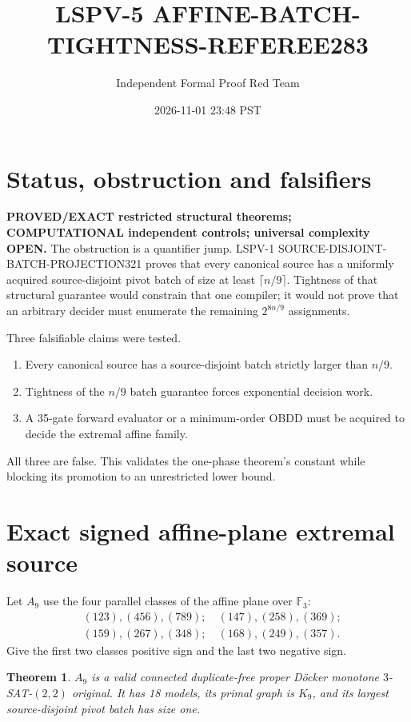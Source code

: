 \documentclass[11pt]{article}
\title{LSPV-5 AFFINE-BATCH-TIGHTNESS-REFEREE283}
\author{Independent Formal Proof Red Team}
\date{2026-11-01 23:48 PST}
\newtheorem{theorem}{Theorem}
\begin{document}
\maketitle

\section{Status, obstruction and falsifiers}

\textbf{PROVED/EXACT restricted structural theorems; COMPUTATIONAL independent
controls; universal complexity OPEN.}  The obstruction is a quantifier jump.
LSPV-1 SOURCE-DISJOINT-BATCH-PROJECTION321 proves that every canonical source
has a uniformly acquired source-disjoint pivot batch of size at least
$\lceil n/9\rceil$.  Tightness of that structural guarantee would constrain
that one compiler; it would not prove that an arbitrary decider must enumerate
the remaining $2^{8n/9}$ assignments.

Three falsifiable claims were tested.
\begin{enumerate}
\item Every canonical source has a source-disjoint batch strictly larger than
$n/9$.
\item Tightness of the $n/9$ batch guarantee forces exponential decision work.
\item A 35-gate forward evaluator or a minimum-order OBDD must be acquired to
decide the extremal affine family.
\end{enumerate}
All three are false.  This validates the one-phase theorem's constant while
blocking its promotion to an unrestricted lower bound.

\section{Exact signed affine-plane extremal source}

Let $A_9$ use the four parallel classes of the affine plane over
$\mathbb F_3$:
\begin{align*}
&(123),(456),(789);\quad (147),(258),(369);\\
&(159),(267),(348);\quad (168),(249),(357).
\end{align*}
Give the first two classes positive sign and the last two negative sign.

\begin{theorem}
$A_9$ is a valid connected duplicate-free proper D{\"o}cker monotone
$3$-SAT-$(2,2)$ original.  It has 18 models, its primal graph is $K_9$, and
its largest source-disjoint pivot batch has size one.
\end{theorem}
\end{document}
